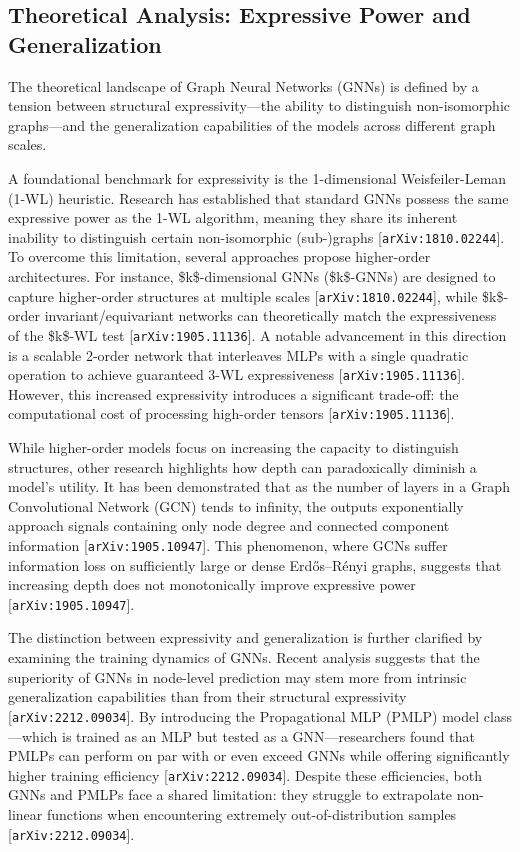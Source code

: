 \documentclass[11pt]{article}
\begin{document}
\subsection{Theoretical Analysis: Expressive Power and Generalization}

The theoretical landscape of Graph Neural Networks (GNNs) is defined by a tension between structural expressivity—the ability to distinguish non-isomorphic graphs—and the generalization capabilities of the models across different graph scales.

A foundational benchmark for expressivity is the 1-dimensional Weisfeiler-Leman (1-WL) heuristic. Research has established that standard GNNs possess the same expressive power as the 1-WL algorithm, meaning they share its inherent inability to distinguish certain non-isomorphic (sub-)graphs [\texttt{arXiv:1810.02244}]. To overcome this limitation, several approaches propose higher-order architectures. For instance, \$k\$-dimensional GNNs (\$k\$-GNNs) are designed to capture higher-order structures at multiple scales [\texttt{arXiv:1810.02244}], while \$k\$-order invariant/equivariant networks can theoretically match the expressiveness of the \$k\$-WL test [\texttt{arXiv:1905.11136}]. A notable advancement in this direction is a scalable 2-order network that interleaves MLPs with a single quadratic operation to achieve guaranteed 3-WL expressiveness [\texttt{arXiv:1905.11136}]. However, this increased expressivity introduces a significant trade-off: the computational cost of processing high-order tensors [\texttt{arXiv:1905.11136}].

While higher-order models focus on increasing the capacity to distinguish structures, other research highlights how depth can paradoxically diminish a model's utility. It has been demonstrated that as the number of layers in a Graph Convolutional Network (GCN) tends to infinity, the outputs exponentially approach signals containing only node degree and connected component information [\texttt{arXiv:1905.10947}]. This phenomenon, where GCNs suffer information loss on sufficiently large or dense Erdős–Rényi graphs, suggests that increasing depth does not monotonically improve expressive power [\texttt{arXiv:1905.10947}].

The distinction between expressivity and generalization is further clarified by examining the training dynamics of GNNs. Recent analysis suggests that the superiority of GNNs in node-level prediction may stem more from intrinsic generalization capabilities than from their structural expressivity [\texttt{arXiv:2212.09034}]. By introducing the Propagational MLP (PMLP) model class—which is trained as an MLP but tested as a GNN—researchers found that PMLPs can perform on par with or even exceed GNNs while offering significantly higher training efficiency [\texttt{arXiv:2212.09034}]. Despite these efficiencies, both GNNs and PMLPs face a shared limitation: they struggle to extrapolate non-linear functions when encountering extremely out-of-distribution samples [\texttt{arXiv:2212.09034}].
\end{document}
